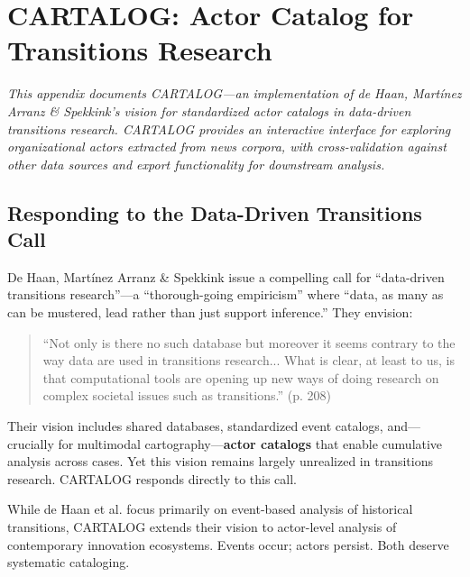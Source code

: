 \documentclass[../main.tex]{subfiles}
\begin{document}
\chapter{CARTALOG: Actor Catalog for Transitions Research}
\label{app:cartalog}

\noindent\textit{This appendix documents \textsc{CARTALOG}---an implementation of de Haan, Martínez Arranz \& Spekkink's vision for standardized actor catalogs in data-driven transitions research. \textsc{CARTALOG} provides an interactive interface for exploring organizational actors extracted from news corpora, with cross-validation against other data sources and export functionality for downstream analysis.}

\bigskip


\section{Responding to the Data-Driven Transitions Call}

De Haan, Martínez Arranz \& Spekkink \citeyear{dehaan2019datadriven} issue a compelling call for ``data-driven transitions research''---a ``thorough-going empiricism'' where ``data, as many as can be mustered, lead rather than just support inference.'' They envision:

\begin{quote}
``Not only is there no such database but moreover it seems contrary to the way data are used in transitions research... What is clear, at least to us, is that computational tools are opening up new ways of doing research on complex societal issues such as transitions.'' (p. 208)
\end{quote}

Their vision includes shared databases, standardized event catalogs, and---crucially for multimodal cartography---\textbf{actor catalogs} that enable cumulative analysis across cases. Yet this vision remains largely unrealized in transitions research. \textsc{CARTALOG} responds directly to this call.

\begin{insightbox}
While de Haan et al. focus primarily on event-based analysis of historical transitions, \textsc{CARTALOG} extends their vision to actor-level analysis of contemporary innovation ecosystems. Events occur; actors persist. Both deserve systematic cataloging.
\end{insightbox}
\end{document}
